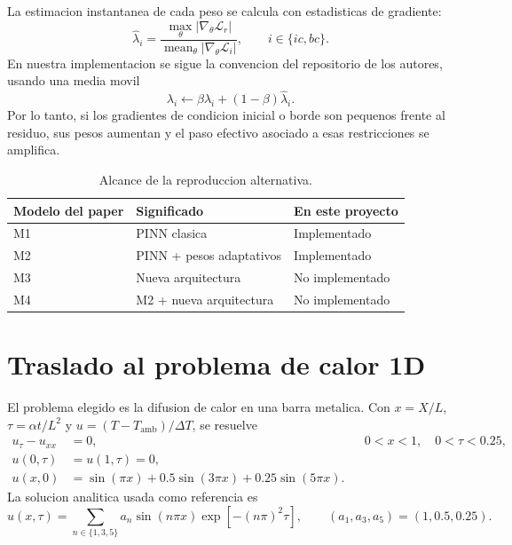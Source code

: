 \documentclass[11pt,a4paper]{article}
\begin{document}
La estimacion instantanea de cada peso se calcula con estadisticas de gradiente:
\begin{equation}
  \widehat{\lambda}_i =
  \frac{\max_\theta |\nabla_\theta \mathcal{L}_r|}
       {\operatorname{mean}_\theta |\nabla_\theta \mathcal{L}_i|},
  \qquad i\in\{ic,bc\}.
\end{equation}
En nuestra implementacion se sigue la convencion del repositorio de los
autores, usando una media movil
\begin{equation}
  \lambda_i \leftarrow
  \beta\lambda_i + (1-\beta)\widehat{\lambda}_i.
\end{equation}
Por lo tanto, si los gradientes de condicion inicial o borde son pequenos frente
al residuo, sus pesos aumentan y el paso efectivo asociado a esas restricciones
se amplifica.

\begin{table}[H]
\centering
\begin{tabular}{lll}
\toprule
Modelo del paper & Significado & En este proyecto \\
\midrule
M1 & PINN clasica & Implementado \\
M2 & PINN + pesos adaptativos & Implementado \\
M3 & Nueva arquitectura & No implementado \\
M4 & M2 + nueva arquitectura & No implementado \\
\bottomrule
\end{tabular}
\caption{Alcance de la reproduccion alternativa.}
\end{table}

\section{Traslado al problema de calor 1D}

El problema elegido es la difusion de calor en una barra metalica. Con
$x=X/L$, $\tau=\alpha t/L^2$ y
$u=(T-T_{\mathrm{amb}})/\Delta T$, se resuelve
\begin{align}
  u_\tau - u_{xx} &= 0,
  &&0<x<1,\quad 0<\tau<0.25,\\
  u(0,\tau) &= u(1,\tau)=0,\\
  u(x,0) &= \sin(\pi x)+0.5\sin(3\pi x)+0.25\sin(5\pi x).
\end{align}
La solucion analitica usada como referencia es
\begin{equation}
  u(x,\tau)=
  \sum_{n\in\{1,3,5\}}a_n
  \sin(n\pi x)\exp\left[-(n\pi)^2\tau\right],
  \qquad
  (a_1,a_3,a_5)=(1,0.5,0.25).
\end{equation}
\end{document}
